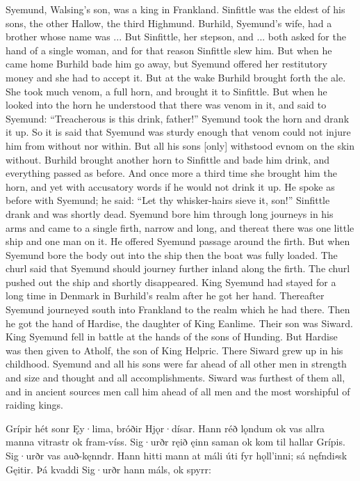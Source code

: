 \bpb Syemund, Walsing’s son, was a king in Frankland.  Sinfittle was the eldest of his sons, the other Hallow, the third Highmund.  Burhild, Syemund’s wife, had a brother whose name was ...  But Sinfittle, her stepson, and ... both asked for the hand of a single woman, and for that reason Sinfittle slew him.  But when he came home Burhild bade him go away, but Syemund offered her restitutory money and she had to accept it.  But at the wake Burhild brought forth the ale.  She took much venom, a full horn, and brought it to Sinfittle.  But when he looked into the horn he understood that there was venom in it, and said to Syemund: “Treacherous is this drink, father!”  Syemund took the horn and drank it up.  So it is said that Syemund was sturdy enough that venom could not injure him from without nor within.  But all his sons [only] withstood evnom on the skin without.  Burhild brought another horn to Sinfittle and bade him drink, and everything passed as before.  And once more a third time she brought him the horn, and yet with accusatory words if he would not drink it up.  He spoke as before with Syemund; he said: “Let thy whisker-hairs sieve it, son!”  Sinfittle drank and was shortly dead.
Syemund bore him through long journeys in his arms and came to a single firth, narrow and long, and thereat there was one little ship and one man on it.  He offered Syemund passage around the firth.  But when Syemund bore the body out into the ship then the boat was fully loaded.  The churl said that Syemund should journey further inland along the firth.  The churl pushed out the ship and shortly disappeared.
King Syemund had stayed for a long time in Denmark in Burhild’s realm after he got her hand.  Thereafter Syemund journeyed south into Frankland to the realm which he had there.  Then he got the hand of Hardise, the daughter of King Eanlime.  Their son was Siward.  King Syemund fell in battle at the hands of the sons of Hunding.  But Hardise was then given to Atholf, the son of King Helpric.  There Siward grew up in his childhood.  Syemund and all his sons were far ahead of all other men in strength and size and thought and all accomplishments.  Siward was furthest of them all, and in ancient sources men call him ahead of all men and the most worshipful of raiding kings.\epb\epg


\bpg\bpa Grípir hét sonr Ęy·lima, bróðir Hjǫr·dísar.  Hann réð lǫndum ok vas allra manna vitrastr ok fram-víss.  Sig·urðr ręið ęinn saman ok kom til hallar Grípis.  Sig·urðr vas auð-kęnndr.  Hann hitti mann at máli úti fyr hǫll’inni; sá nęfndi⸗sk Gęitir.  Þá kvaddi Sig·urðr hann máls, ok spyrr:\epa


